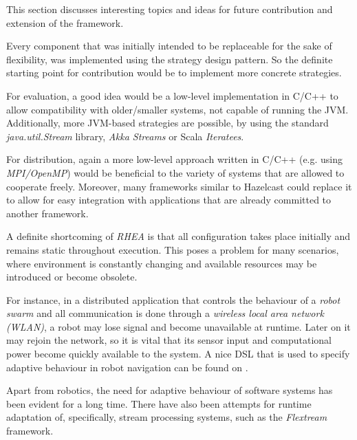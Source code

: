\documentclass{dithesis}
\begin{document}

This section discusses interesting topics and ideas for future contribution and extension of the framework.


Every component that was initially intended to be replaceable for the sake of flexibility, was implemented using the strategy design pattern. So the definite starting point for contribution would be to implement more concrete strategies.

For evaluation, a good idea would be a low-level implementation in C/C++ to allow compatibility with older/smaller systems, not capable of running the JVM. Additionally, more JVM-based strategies are possible, by using the standard \textit{java.util.Stream} library\cite{java_streams}, \textit{Akka Streams} or Scala \textit{Iteratees}\cite{iteratees}.

For distribution, again a more low-level approach written in C/C++ (e.g. using \textit{MPI/OpenMP}) would be beneficial to the variety of systems that are allowed to cooperate freely. Moreover, many frameworks similar to Hazelcast could replace it to allow for easy integration with applications that are already committed to another framework.


A definite shortcoming of \textit{RHEA} is that all configuration takes place initially and remains static throughout execution. This poses a problem for many scenarios, where environment is constantly changing and available resources may be introduced or become obsolete. 

For instance, in a distributed application that controls the behaviour of a \textit{robot swarm} and all communication is done through a \textit{wireless local area network (WLAN)}, a robot may lose signal and become unavailable at runtime. Later on it may rejoin the network, so it is vital that its sensor input and computational power become quickly available to the system. A nice DSL that is used to specify adaptive behaviour in robot navigation can be found on \cite{reconf_robot}.

Apart from robotics, the need for adaptive behaviour of software systems has been evident for a long time\cite{reconf_survey}. There have also been attempts for runtime adaptation of, specifically, stream processing systems, such as the \textit{Flextream} framework\cite{flextream}. 
\end{document}
